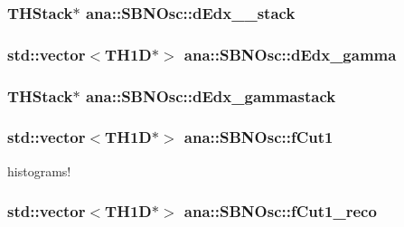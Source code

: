 \label{namespaceana_1_1SBNOsc_ab49147463b012e19132ce3747551ddfd}
\hypertarget{namespaceana_1_1SBNOsc_ab1c4aa783d9a2387391c600f3988fac5}{
\subsubsection[{dEdx\_\-2\_\-stack}]{\setlength{\rightskip}{0pt plus 5cm}THStack$\ast$ {\bf ana::SBNOsc::dEdx\_\_\-stack}}}
\label{namespaceana_1_1SBNOsc_ab1c4aa783d9a2387391c600f3988fac5}
\hypertarget{namespaceana_1_1SBNOsc_a8bedf9b350e32fa2630521a1eb2a3b3c}{
\subsubsection[{dEdx\_\-gamma}]{\setlength{\rightskip}{0pt plus 5cm}std::vector$<$TH1D$\ast$$>$ {\bf ana::SBNOsc::dEdx\_\-gamma}}}
\label{namespaceana_1_1SBNOsc_a8bedf9b350e32fa2630521a1eb2a3b3c}
\hypertarget{namespaceana_1_1SBNOsc_a8edd8b5017a133cdd3e468899e0f7a5f}{
\subsubsection[{dEdx\_\-gammastack}]{\setlength{\rightskip}{0pt plus 5cm}THStack$\ast$ {\bf ana::SBNOsc::dEdx\_\-gammastack}}}
\label{namespaceana_1_1SBNOsc_a8edd8b5017a133cdd3e468899e0f7a5f}
\hypertarget{namespaceana_1_1SBNOsc_a2b70de8a58ae31f4f22507b834355ca3}{
\subsubsection[{fCut1}]{\setlength{\rightskip}{0pt plus 5cm}std::vector$<$TH1D$\ast$$>$ {\bf ana::SBNOsc::fCut1}}}
\label{namespaceana_1_1SBNOsc_a2b70de8a58ae31f4f22507b834355ca3}
histograms! \hypertarget{namespaceana_1_1SBNOsc_a6a5934f9b51a16fc44557f0db1333821}{
\subsubsection[{fCut1\_\-reco}]{\setlength{\rightskip}{0pt plus 5cm}std::vector$<$TH1D$\ast$$>$ {\bf ana::SBNOsc::fCut1\_\-reco}}}
